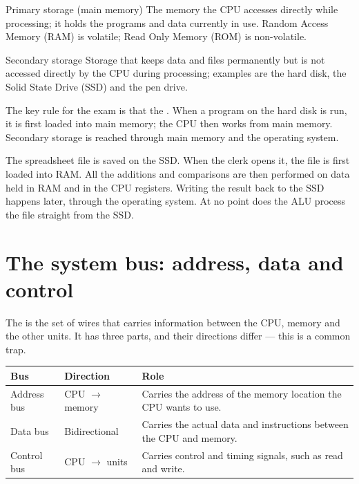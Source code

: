 \begin{definitionbox}{Primary storage (main memory)}
The memory the CPU accesses directly while processing; it holds the programs
and data currently in use. Random Access Memory (RAM) is volatile; Read Only
Memory (ROM) is non-volatile.
\end{definitionbox}

\begin{definitionbox}{Secondary storage}
Storage that keeps data and files permanently but is not accessed directly by
the CPU during processing; examples are the hard disk, the Solid State Drive
(SSD) and the pen drive.
\end{definitionbox}

The key rule for the exam is that the . When a program on the hard disk is run, it is first
loaded into main memory; the CPU then works from main memory. Secondary
storage is reached through main memory and the operating system.

\begin{example}
The spreadsheet file is saved on the SSD. When the clerk opens it, the file is
first loaded into RAM. All the additions and comparisons are then performed
on data held in RAM and in the CPU registers. Writing the result back to the
SSD happens later, through the operating system. At no point does the ALU
process the file straight from the SSD.
\end{example}

\section{The system bus: address, data and control}
The  is the set of wires that carries information between the
CPU, memory and the other units. It has three parts, and their directions
differ --- this is a common trap.

\begin{center}
\begin{tabular}{p{}p{}p{}}
\toprule
\textbf{Bus} & \textbf{Direction} & \textbf{Role}\\
\midrule
Address bus & CPU $\rightarrow$ memory & Carries the address of the memory
location the CPU wants to use.\\
Data bus & Bidirectional & Carries the actual data and instructions between
the CPU and memory.\\
Control bus & CPU $\rightarrow$ units & Carries control and timing signals,
such as read and write.\\
\bottomrule
\end{tabular}
\end{center}

